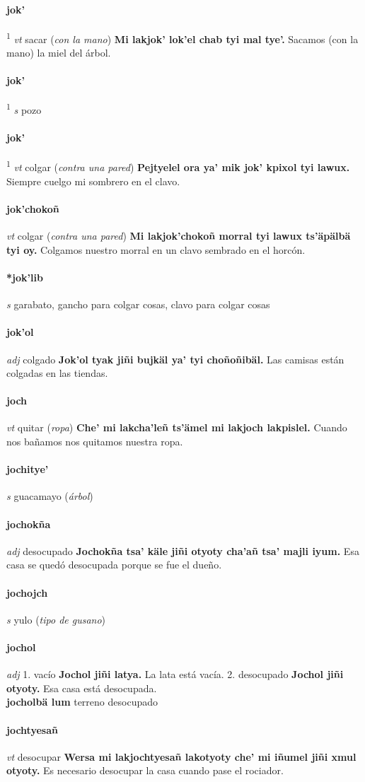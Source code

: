 \documentclass{scrbook}
\newcommand{\entry}[1]{\paragraph{#1}}
\newcommand{\onedefinition}[1]{#1.}
\newcommand{\defsuperscript}[1]{\textsuperscript{1}}
\newcommand{\partofspeech}[1]{\textit{#1}}
\newcommand{\spanishtranslation}[1]{#1}
\newcommand{\clarification}[1]{(\textit{#1})}
\newcommand{\cholexample}[1]{\textbf{#1}}
\newcommand{\exampletranslation}[1]{#1}
\newcommand{\secondaryentry}[1]{\\\textbf{#1}}
\newcommand{\secondtranslation}[1]{#1}
\begin{document}
\begin{multicols}{2}
\entry{jok'}
\defsuperscript{1}
\partofspeech{vt}
\spanishtranslation{sacar}
\clarification{con la mano}
\cholexample{Mi lakjok' lok'el chab tyi mal tye'.}
\exampletranslation{Sacamos (con la mano) la miel del árbol.}

\entry{jok'}
\defsuperscript{3}
\partofspeech{s}
\spanishtranslation{pozo}

\entry{jok'}
\defsuperscript{2}
\partofspeech{vt}
\spanishtranslation{colgar}
\clarification{contra una pared}
\cholexample{Pejtyelel ora ya' mik jok' kpixol tyi lawux.}
\exampletranslation{Siempre cuelgo mi sombrero en el clavo.}

\entry{jok'chokoñ}
\partofspeech{vt}
\spanishtranslation{colgar}
\clarification{contra una pared}
\cholexample{Mi lakjok'chokoñ morral tyi lawux ts'äpälbä tyi oy.}
\exampletranslation{Colgamos nuestro morral en un clavo sembrado en el horcón.}

\entry{*jok'lib}
\partofspeech{s}
\spanishtranslation{garabato, gancho para colgar cosas, clavo para colgar cosas}

\entry{jok'ol}
\partofspeech{adj}
\spanishtranslation{colgado}
\cholexample{Jok'ol tyak jiñi bujkäl ya' tyi choñoñibäl.}
\exampletranslation{Las camisas están colgadas en las tiendas.}

\entry{joch}
\partofspeech{vt}
\spanishtranslation{quitar}
\clarification{ropa}
\cholexample{Che' mi lakcha'leñ ts'ämel mi lakjoch lakpislel.}
\exampletranslation{Cuando nos bañamos nos quitamos nuestra ropa.}

\entry{jochitye'}
\partofspeech{s}
\spanishtranslation{guacamayo}
\clarification{árbol}

\entry{jochokña}
\partofspeech{adj}
\spanishtranslation{desocupado}
\cholexample{Jochokña tsa' käle jiñi otyoty cha'añ tsa' majli iyum.}
\exampletranslation{Esa casa se quedó desocupada porque se fue el dueño.}

\entry{jochojch}
\partofspeech{s}
\spanishtranslation{yulo}
\clarification{tipo de gusano}

\entry{jochol}
\partofspeech{adj}
\onedefinition{1}
\spanishtranslation{vacío}
\cholexample{Jochol jiñi latya.}
\exampletranslation{La lata está vacía.}
\onedefinition{2}
\spanishtranslation{desocupado}
\cholexample{Jochol jiñi otyoty.}
\exampletranslation{Esa casa está desocupada.}
\secondaryentry{jocholbä lum}
\secondtranslation{terreno desocupado}

\entry{jochtyesañ}
\partofspeech{vt}
\spanishtranslation{desocupar}
\cholexample{Wersa mi lakjochtyesañ lakotyoty che' mi iñumel jiñi xmul otyoty.}
\exampletranslation{Es necesario desocupar la casa cuando pase el rociador.}


\end{multicols}
\end{document}
